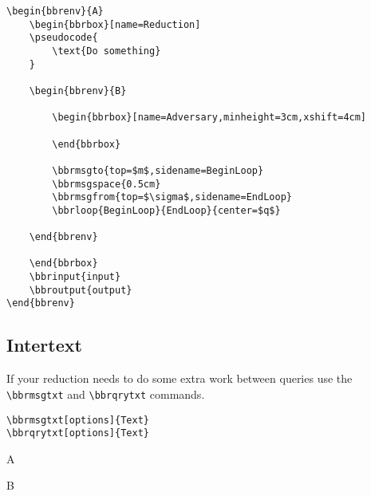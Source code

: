 \documentclass[a4paper]{report}
\begin{document}
\begin{lstlisting}
\begin{bbrenv}{A}
	\begin{bbrbox}[name=Reduction]
	\pseudocode{
		\text{Do something} 
	}

	\begin{bbrenv}{B}

		\begin{bbrbox}[name=Adversary,minheight=3cm,xshift=4cm]

		\end{bbrbox}
		
		\bbrmsgto{top=$m$,sidename=BeginLoop}
		\bbrmsgspace{0.5cm}
		\bbrmsgfrom{top=$\sigma$,sidename=EndLoop}
		\bbrloop{BeginLoop}{EndLoop}{center=$q$}

	\end{bbrenv}

	\end{bbrbox}
	\bbrinput{input}
	\bbroutput{output}
\end{bbrenv}
\end{lstlisting}

\subsection{Intertext}

If your reduction needs to do some extra work between queries use the \lstinline$\bbrmsgtxt$
and \lstinline$\bbrqrytxt$ commands.
\begin{lstlisting}
\bbrmsgtxt[options]{Text}
\bbrqrytxt[options]{Text}
\end{lstlisting}
\begin{bbrenv}{A}
	\begin{bbrbox}[name=Reduction]

	\begin{bbrenv}{B}

		\begin{bbrbox}[name=Adversary,minheight=3cm,xshift=4cm]

		\end{bbrbox}
		


	\end{bbrenv}

	\end{bbrbox}
\end{bbrenv}
\end{document}

